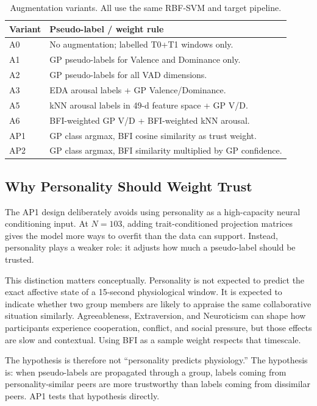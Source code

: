 \documentclass[sigconf,review,anonymous]{acmart}
\begin{document}
\begin{table}[t]
\caption{Augmentation variants. All use the same RBF-SVM and target pipeline.}
\label{tab:variant_defs}
\centering
\setlength{\tabcolsep}{3pt}
\small
\begin{tabular}{l>{\raggedright\arraybackslash}p{}}
\toprule
\textbf{Variant} & \textbf{Pseudo-label / weight rule} \\
\midrule
A0 & No augmentation; labelled T0+T1 windows only. \\
A1 & GP pseudo-labels for Valence and Dominance only. \\
A2 & GP pseudo-labels for all VAD dimensions. \\
A3 & EDA arousal labels + GP Valence/Dominance. \\
A5 & kNN arousal labels in 49-d feature space + GP V/D. \\
A6 & BFI-weighted GP V/D + BFI-weighted kNN arousal. \\
AP1 & GP class argmax, BFI cosine similarity as trust weight. \\
AP2 & GP class argmax, BFI similarity multiplied by GP confidence. \\
\bottomrule
\end{tabular}
\end{table}

\subsection{Why Personality Should Weight Trust}
\label{sec:why_bfi}

The AP1 design deliberately avoids using personality as a high-capacity neural
conditioning input.
At $N=103$, adding trait-conditioned projection matrices gives the model more
ways to overfit than the data can support.
Instead, personality plays a weaker role: it adjusts how much a pseudo-label
should be trusted.

This distinction matters conceptually.
Personality is not expected to predict the exact affective state of a
15-second physiological window.
It is expected to indicate whether two group members are likely to appraise the
same collaborative situation similarly.
Agreeableness, Extraversion, and Neuroticism can shape how participants
experience cooperation, conflict, and social pressure, but those effects are
slow and contextual.
Using BFI as a sample weight respects that timescale.

The hypothesis is therefore not ``personality predicts physiology.''
The hypothesis is: when pseudo-labels are propagated through a group, labels
coming from personality-similar peers are more trustworthy than labels coming
from dissimilar peers.
AP1 tests that hypothesis directly.
\end{document}
